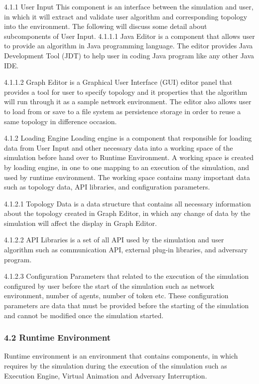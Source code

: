 4.1.1 User Input
This component is an interface between the simulation and user, in which it will extract and validate user algorithm and corresponding topology into the environment. The following will discuss some detail about subcomponents of User Input.
4.1.1.1 Java Editor is a component that allows user to provide an algorithm in Java programming language. The editor provides Java Development Tool (JDT) to help user in coding Java program like any other Java IDE.

4.1.1.2 Graph Editor is a Graphical User Interface (GUI) editor panel that provides a tool for user to specify topology and it properties that the algorithm will run through it as a sample network environment. The editor also allows user to load from or save to a file system as persistence storage in order to reuse a same topology in difference occasion.

4.1.2 Loading Engine
Loading engine is a component that responsible for loading data from User Input and other necessary data into a working space of the simulation before hand over to Runtime Environment. A working space is created by loading engine, in one to one mapping to an execution of the simulation, and used by runtime environment. The working space contains many important data such as topology data, API libraries, and configuration parameters.

4.1.2.1 Topology Data is a data structure that contains all necessary information about the topology created in Graph Editor, in which any change of data by the simulation will affect the display in Graph Editor.

4.1.2.2 API Libraries is a set of all API used by the simulation and user algorithm such as communication API, external plug-in libraries, and adversary program.

4.1.2.3 Configuration Parameters that related to the execution of the simulation configured by user before the start of the simulation such as network environment, number of agents, number of token etc. These configuration parameters are data that must be provided before the starting of the simulation and cannot be modified once the simulation started.

\subsubsection{4.2 Runtime Environment}

Runtime environment is an environment that contains components, in which requires by the simulation during the execution of the simulation such as Execution Engine, Virtual Animation and Adversary Interruption.



